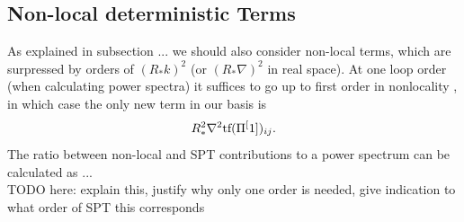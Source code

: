 \documentclass[11pt]{book}
\DeclareRobustCommand{\tf}{\ifmmode\text{tf}\else d\fi}
\begin{document}
\subsection{Non-local deterministic Terms}
As explained in subsection ... %
we should also consider non-local terms, which are surpressed by orders of $(R_*k)^2$ (or $(R_*\nabla)^2$ in real space). At one loop order (when calculating power spectra) it suffices to go up to first order in nonlocality \cite{Mirbabayi_2015}, in which case the only new term in our basis is
$$
R^2_*\nabla^2\tf(\Pi^[1])_{ij}.
$$
The ratio between non-local and SPT contributions to a power spectrum can be calculated as ... \\
TODO here: explain this, justify why only one order is needed, give indication to what order of SPT this corresponds
\end{document}
